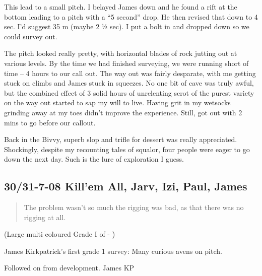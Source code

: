 This lead to a small pitch. I belayed James down and he found a rift at
the bottom leading to a pitch with a ``5 second'' drop. He then revised
that down to 4 sec. I'd suggest 35 m (maybe 2 ½ sec). I put a bolt in
and dropped down so we could survey out.

The  pitch looked really pretty, with horizontal
blades of rock jutting out at various levels. By the time we had
finished surveying, we were running short of time -- 4 hours to our call
out. The way out was fairly desparate, with me getting stuck on climbs
and James stuck in squeezes. No one bit of cave was truly awful, but the
combined effect of 3 solid hours of unrelenting scrot of the purest
variety on the way out started to sap my will to live. Having grit in my
wetsocks grinding away at my toes didn't improve the experience. Still,
got out with 2 mins to go before our callout.

Back in the Bivvy, superb slop and trifle for dessert was really
appreciated. Shockingly, despite my recounting tales of squalor, four
people were eager to go down the next day. Such is the lure of
exploration I guess.


\subsection{30/31-7-08 Kill'em All, Jarv, Izi, Paul,
James}


\begin{quote}The problem wasn't so much the rigging was bad, as that there was no rigging at all.
\end{quote}


(Large multi coloured Grade I of  - )

James Kirkpatrick's first grade 1 survey:  Many
curious avens on pitch.

Followed on from  development. James KP
